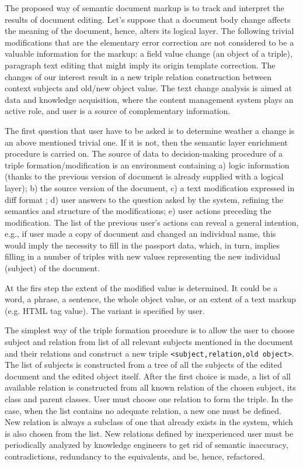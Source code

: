 \documentclass[conference]{IEEEtran}
\begin{document}
The proposed way of semantic document markup is to track and interpret
the results of document editing.  Let's suppose that a document body
change affects the meaning of the document, hence, alters its logical
layer.  The following trivial modifications that are the elementary
error correction are not considered to be a valuable information for
the markup: a field value change (an object of a triple), paragraph
text editing that might imply its origin template correction.  The
changes of our interest result in a new triple relation construction
between context subjects and old/new object value.  The text change
analysis is aimed at data and knowledge acquisition, where the content
management system plays an active role, and user is a source of
complementary information.

The first question that user have to be asked is to determine weather
a change is an above mentioned trivial one.  If it is not, then the
semantic layer enrichment procedure is carried on.  The source of data
to decision-making procedure of a triple formation/modification is an
environment containing a) logic information (thanks to the previous
version of document is already supplied with a logical layer); b) the
source version of the document, c) a text modification expressed in
diff format \cite{b9}; d) user answers to the question asked by the
system, refining the semantics and structure of the modifications; e)
user actions preceding the modification.  The list of the previous
user's actions can reveal a general intention, e.g., if user made a
copy of document and changed an individual name, this would imply the
necessity to fill in the passport data, which, in turn, implies
filling in a number of triples with new values representing the new
individual (subject) of the document.

At the firs step the extent of the modified value is determined.  It
could be a word, a phrase, a sentence, the whole object value, or an
extent of a text markup (e.g. HTML tag value).  The variant is
specified by user.

The simplest way of the triple formation procedure is to allow the
user to choose subject and relation from list of all relevant subjects
mentioned in the document and their relations and construct a new
triple \texttt{<subject,relation,old object>}.  The list of subjects
is constructed from a tree of all the subjects of the edited document
and the edited object itself.  After the first choice is made, a list
of all available relation is constructed from all known relation of
the chosen subject, its class and parent classes.  User must choose
one relation to form the triple.  In the case, when the list contains
no adequate relation, a new one must be defined.  New relation is
always a subclass of one that already exists in the system, which is
also chosen from the list.  New relations defined by inexperienced user
must be periodically analyzed by knowledge engineers to get rid of
semantic inaccuracy, contradictions, redundancy to the equivalents,
and be, hence, refactored.
\end{document}
